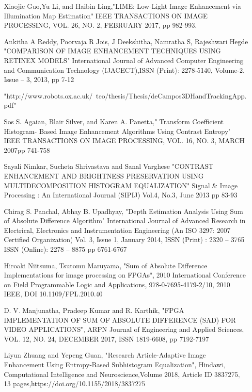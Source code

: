 \begin{thebibliography}{111}

	 Xiaojie Guo,Yu Li, and Haibin Ling,"LIME: Low-Light Image Enhancement via  
	Illumination Map Estimation" IEEE TRANSACTIONS ON IMAGE PROCESSING, VOL. 26, NO. 2, FEBRUARY 2017, 
	pp 982-993. 
	
	 Ankitha A Reddy, Poorvaja R Jois, J Deekshitha, Namratha S, Rajeshwari Hegde 
	"COMPARISON OF IMAGE ENHANCEMENT TECHNIQUES USING RETINEX MODELS" International Journal of Advanced 
	Computer Engineering and Communication Technology (IJACECT),ISSN (Print): 2278-5140, Volume-2, Issue 
	– 3, 2013, pp 7-12

	"http://www.robots.ox.ac.uk/~teo/thesis/Thesis/deCampos3DHandTrackingApp.pdf"
	
	 Sos S. Agaian, Blair Silver, and Karen A. Panetta," Transform Coefficient Histogram-
	Based Image Enhancement Algorithms Using Contrast Entropy" IEEE TRANSACTIONS ON IMAGE PROCESSING, 
	VOL. 16, NO. 3, MARCH 2007pp 741-758

	 Sayali Nimkar, Sucheta Shrivastava and Sanal Varghese "CONTRAST ENHANCEMENT AND 
	BRIGHTNESS PRESERVATION USING MULTIDECOMPOSITION HISTOGRAM EQUALIZATION" Signal & Image Processing : 
	An International Journal (SIPIJ) Vol.4, No.3, June 2013 pp 83-93
	
	 Chirag S. Panchal, Abhay B. Upadhyay, "Depth Estimation Analysis Using Sum of 
	Absolute Difference Algorithm" International Journal of Advanced Research in Electrical, Electronics 
	and Instrumentation Engineering (An ISO 3297: 2007 Certified Organization) Vol. 3, Issue 1, January 
	2014, ISSN (Print) : 2320 – 3765 ISSN (Online): 2278 – 8875 pp 6761-6767
	
	 Hiroaki Niitsuma, Tsutomu Maruyama, "Sum of Absolute Difference Implementations for 
	image processing on FPGAs", 2010 International Conference on Field Programmable Logic and 
	Applications, 978-0-7695-4179-2/10, 2010 IEEE, DOI 10.1109/FPL.2010.40

	 D. V. Manjunatha, Pradeep Kumar and R. Karthik, "FPGA IMPLEMENTATION OF SUM OF 
	ABSOLUTE DIFFERENCE (SAD) FOR VIDEO APPLICATIONS", ARPN Journal of Engineering and Applied Sciences, 
	VOL. 12, NO. 24, DECEMBER 2017, ISSN 1819-6608, pp 7192-7197

	 Liyun Zhuang and Yepeng Guan, "Research Article-Adaptive Image Enhancement Using 
	Entropy-Based Subhistogram Equalization", Hindawi, Computational Intelligence and 
	Neuroscience,Volume 2018, Article ID 3837275, 13 pages,https://doi.org/10.1155/2018/3837275


\end{thebibliography}
